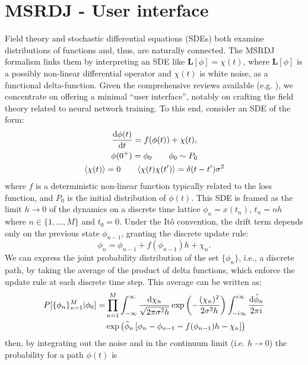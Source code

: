 \section{MSRDJ - User interface}
Field theory and stochastic differential equations (SDEs) both examine distributions of functions and, thus, are naturally connected. The MSRDJ formalism links them by interpreting an SDE like $\bm{L}[\phi]=\chi(t)$, where $\bm{L}[\phi]$ is a possibly non-linear differential operator and $\chi(t)$ is white noise, as a functional delta-function. Given the comprehensive reviews available (e.g. \cite{MoritzBook}), we concentrate on offering a minimal ``user interface'', notably on crafting the field theory related to neural network training. To this end, consider an SDE of the form:
\begin{gather} \label{consider this sde}
\frac{\text{d} \phi(t)}{\text{d} t} = f(\phi(t)) +\chi(t), \\  \nonumber
\phi(0^+)=\phi_0 \quad \quad \phi_0\sim P_0 \\  \nonumber
\langle\chi(t)\rangle=0\quad\quad\langle\chi(t)\chi(t')\rangle=\delta(t-t')\sigma^2
\end{gather}
where $f$ is a deterministic non-linear function typically related to the loss function, and $P_0$ is the initial distribution of $\phi(t)$. This SDE is framed as the limit $h\rightarrow 0$ of the dynamics on a discrete time lattice $\phi_n=x(t_n)$,  $t_n=n h$ where $n\in\{1,\dots,M\}$ and $t_0 = 0$.
Under the Itô convention, the drift term depends only on the previous state $\phi_{n-1}$, granting the discrete update rule:
\begin{equation}\label{Ito difference equation}
\phi_{n} = \phi_{n-1} + f(\phi_{n-1}) h +\chi_n.
\end{equation}
We can express the joint probability distribution of the set $\{\phi_n\}$, i.e., a discrete path, by taking the average of the product of delta functions, which enforce the update rule at each discrete time step. This average can be written as:
\begin{align}
P[\{ \phi_n \}_{n=1}^M|\phi_0] = &\prod\limits_{n=1}^M  \int_{-\infty}^{\infty} \frac{\text{d} \chi_n}{\sqrt{2\pi \sigma^2 h}} \exp\left( -\frac{(\chi_n)^2}{2 \sigma^2 h} \right)\int_{-i\infty}^{i\infty} \frac{\text{d} \tilde{\phi}_n}{2\pi i}\notag\\&\exp\left( \tilde{\phi}_n\left[ \phi_n-\phi_{n-1} - f(\phi_{n-1} )h - \chi_n \right] \right)
\end{align}
then, by integrating out the noise and in the continuum limit (i.e. $h\rightarrow 0$) the probability for a path $\phi(t)$ is
